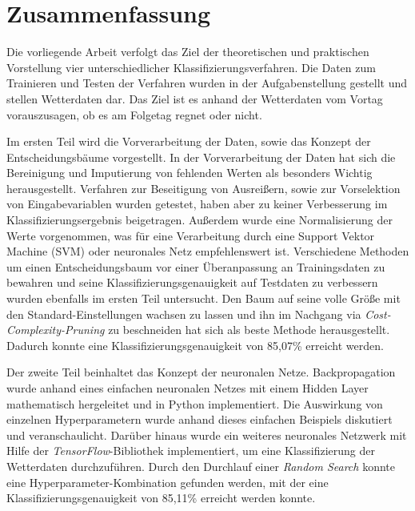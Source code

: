 \pagebreak
\section*{Zusammenfassung}
Die vorliegende Arbeit verfolgt das Ziel der theoretischen und praktischen Vorstellung vier unterschiedlicher Klassifizierungsverfahren. Die Daten zum Trainieren und Testen der Verfahren wurden in der Aufgabenstellung gestellt und stellen Wetterdaten dar. Das Ziel ist es anhand der Wetterdaten vom Vortag vorauszusagen, ob es am Folgetag regnet oder nicht.

\noindent \hspace*{7mm}
Im ersten Teil wird die Vorverarbeitung der Daten, sowie das Konzept der Entscheidungsbäume vorgestellt. In der Vorverarbeitung der Daten hat sich die Bereinigung und Imputierung von fehlenden Werten als besonders Wichtig herausgestellt. Verfahren zur Beseitigung von Ausreißern, sowie zur Vorselektion von Eingabevariablen wurden getestet, haben aber zu keiner Verbesserung im Klassifizierungsergebnis beigetragen. Außerdem wurde eine Normalisierung der Werte vorgenommen, was für eine Verarbeitung durch eine Support Vektor Machine (SVM) oder neuronales Netz empfehlenswert ist. Verschiedene Methoden um einen Entscheidungsbaum vor einer Überanpassung an Trainingsdaten zu bewahren und seine Klassifizierungsgenauigkeit auf Testdaten zu verbessern wurden ebenfalls im ersten Teil untersucht.  Den Baum auf seine volle Größe mit den Standard-Einstellungen wachsen zu lassen und ihn im Nachgang via \emph{Cost-Complexity-Pruning} zu beschneiden hat sich als beste Methode herausgestellt. Dadurch konnte eine Klassifizierungsgenauigkeit von 85,07\% erreicht werden.

\noindent \hspace*{7mm}
Der zweite Teil beinhaltet das Konzept der neuronalen Netze. Backpropagation wurde anhand eines einfachen neuronalen Netzes mit einem Hidden Layer mathematisch hergeleitet und in Python implementiert. Die Auswirkung von einzelnen Hyperparametern wurde anhand dieses einfachen Beispiels diskutiert und veranschaulicht. Darüber hinaus wurde ein weiteres neuronales Netzwerk mit Hilfe der \emph{TensorFlow}-Bibliothek implementiert, um eine Klassifizierung der Wetterdaten durchzuführen. Durch den Durchlauf einer \emph{Random Search} konnte eine Hyperparameter-Kombination gefunden werden, mit der eine Klassifizierungsgenauigkeit von 85,11\% erreicht werden konnte.

